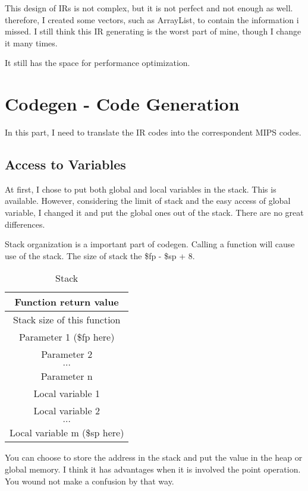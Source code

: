 \documentclass[preprint, 9pt]{sigplanconf}
\begin{document}
    This design of IRs is not complex, but it is not perfect and not enough as well.
    therefore, I created some vectors, such as ArrayList, to contain the information i missed.
    I still think this IR generating is the worst part of mine, though I change it many times.

    It still has the space for performance optimization.

\section{Codegen - Code Generation}

    In this part, I need to translate the IR codes into the correspondent MIPS codes.

    \subsection{Access to Variables}
    At first, I chose to put both global and local variables in the stack.
    This is available.
    However, considering the limit of stack and the easy access of global variable, I changed it and put the global ones out of the stack.
    There are no great differences.

    Stack organization is a important part of codegen.
    Calling a function will cause use of the stack.
    The size of stack the \$fp - \$sp + 8.

\begin{table}[htbp]
  \centering
  \caption{Stack}
    \begin{tabular}{c}
    \hline\hline
    Function return value \\
    \hline
    Stack size of this function \\
    \hline
    Parameter 1 (\$fp here) \\
    Parameter 2 \\
    $\dots $ \\
    Parameter n \\
    \hline
    Local variable 1 \\
    Local variable 2 \\
    $\dots$ \\
    Local variable m (\$sp here) \\
    \hline
    \end{tabular}%
  \label{tab:addlabel}%
\end{table}%

    You can choose to store the address in the stack and put the value in the heap or global memory.
    I think it has advantages when it is involved the point operation.
    You wound not make a confusion by that way.
\end{document}
